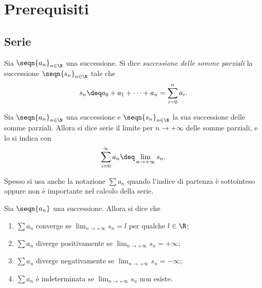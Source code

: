 \chapter{Prerequisiti}

\section{Serie}

\begin{definition}
     Sia $\seqn{a_n}_{n \in \N}$ una successione. Si dice \emph{successione delle somme parziali} la successione $\seqn{s_n}_{n \in \N}$ tale che \[
        s_n \deq a_0 + a_1 + \dots + a_n = \sum_{i=0}^n a_i.    
    \]
\end{definition}

\begin{definition}
    [Serie] Sia $\seqn{a_n}_{n \in \N}$ una successione e $\seqn{s_n}_{n \in \N}$ la sua successione delle somme parziali. Allora si dice serie il limite per $n \to +\infty$ delle somme parziali, e lo si indica con \[
        \sum_{i=0}^\infty a_n \deq \lim_{n\to +\infty} s_n.    
    \]
\end{definition}

Spesso si usa anche la notazione $\sum a_n$ quando l'indice di partenza è sottointeso oppure non è importante nel calcolo della serie.

\begin{definition}
     Sia $\seqn{a_n}$ una successione. Allora si dice che \begin{enumerate}[label={(\arabic*)}]
        \item $\sum a_n$ converge se $\displaystyle\lim_{n \to +\infty} s_n = l$ per qualche $l \in \R$;
        \item $\sum a_n$ diverge positivamente se $\displaystyle\lim_{n \to +\infty} s_n = +\infty$;
        \item $\sum a_n$ diverge negativamente se $\displaystyle\lim_{n \to +\infty} s_n = -\infty$;
        \item $\sum a_n$ è indeterminata se $\displaystyle\lim_{n \to +\infty} s_n$ non esiste.
    \end{enumerate}
\end{definition}

